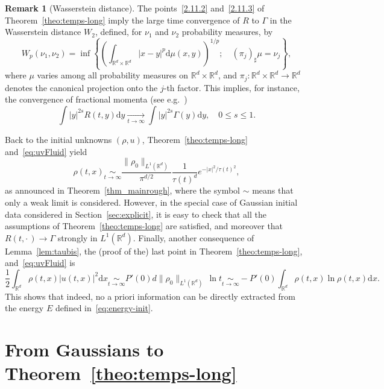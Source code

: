 \documentclass[10pt]{amsart}
\theoremstyle{definition}\newtheorem{defi}[theo]{Definition}\newtheorem{rema}[theo]{Remark}\newtheorem{exam}[theo]{Example}\newtheorem{exem}[theo]{Example}\newtheorem{nota}[theo]{Notation}
\newcommand*\R{\mathbb{R}}
\newcommand*\dd {\mathrm{d}}
\newcommand*\<{\left\langle}
\renewcommand*\>{\right\rangle}
\renewcommand*\le{\leqslant}
\newcommand*\Eq[2]{\mathop{\sim}\limits_{#1\rightarrow#2}}
\newcommand*\Tend[2]{\mathop{\longrightarrow}\limits_{#1\rightarrow#2}}
\begin{document}
\begin{rema}[Wasserstein distance]
The points~\eqref{2.11.2} and~\eqref{2.11.3} of Theorem~\ref{theo:temps-long} imply the large time convergence of $R$ to $\Gamma$ in the Wasserstein distance $W_2$, defined, for $\nu_1$ and $\nu_2$ probability measures, by
\begin{equation*}
W_p(\nu_1,\nu_2)=\inf \left\{ \left(\int_{{\mathbb R}^d\times {\mathbb R}^d}|x-y|^p\dd \mu(x,y)\right)^{1/p};\quad (\pi_j)_\sharp
\mu=\nu_j\right\},
\end{equation*}
where $\mu$ varies among all probability measures on ${\mathbb R}^d\times {\mathbb R}^d$, and $\pi_j:{\mathbb R}^d\times {\mathbb R}^d\to {\mathbb R}^d$ denotes the canonical projection onto the $j$-th factor. This implies, for instance, the convergence of fractional momenta (see e.g.~\cite[Theorem~7.12]{Vi03})
\begin{equation}\label{eq:moment-int}
\int |y|^{2s}R(t,y) \dd y\Tend t \infty \int |y|^{2s}\Gamma(y)\dd y,\quad 0\le s\le 1.
\end{equation}
\end{rema}

Back to the initial unknowns $(\rho,u)$, Theorem~\ref{theo:temps-long} and~\eqref{eq:uvFluid} yield
\begin{equation*}
\rho(t,x)\Eq t \infty
\frac{\|\rho_0\|_{L^1(\R^d)}}{\pi^{d/2}}\frac{1}{\tau(t)^d}e^{-|x|^2/\tau(t)^2},
\end{equation*}
as announced in Theorem~\ref{thm_mainrough}, where the symbol $\sim$ means that only a weak limit is considered. However, in the special case of Gaussian initial data considered in Section~\ref{sec:explicit}, it is easy to check that all the assumptions of Theorem~\ref{theo:temps-long} are satisfied, and moreover that $R(t,\cdot\,)\to \Gamma$ strongly in $L^1(\R^d)$. Finally, another consequence of Lemma~\ref{lem:taubis}, the (proof of the) last point in Theorem~\ref{theo:temps-long}, and~\eqref{eq:uvFluid} is
\begin{equation*}
\frac{1}{2}\int_{\R^d}\rho(t,x) |u(t,x)|^2 \dd x\Eq t \infty P'(0)d\|\rho_0\|_{L^1(\R^d)} \, \ln t \Eq t
\infty -P'(0)\int_{\R^d} \rho(t,x)\ln \rho(t,x)\dd x.
\end{equation*}
This shows that indeed, no a priori information can be directly extracted from the energy $E$ defined in~\eqref{eq:energy-init}.


\section{From Gaussians to Theorem~\ref{theo:temps-long}}\label{sec:longtime}
\end{document}
